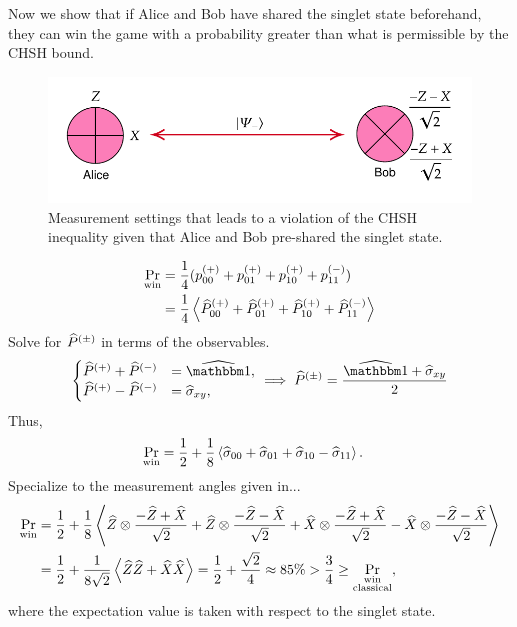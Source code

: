 Now we show that if Alice and Bob have shared the singlet state beforehand, they can win the game with a probability greater than what is permissible by the CHSH bound.
\begin{figure}[h]
	\centering
	\includegraphics[scale=0.75]{fig/chsh-measurement-setting}
	\caption{Measurement settings that leads to a violation of the CHSH inequality given that Alice and Bob pre-shared the singlet state.}
	\label{fig:chsh-setting}
\end{figure}
\begin{align}
	\Pr_{\textrm{win}} &= \frac{1}{4}(p_{00}^{(+)} + p_{01}^{(+)} + p_{10}^{(+)} + p_{11}^{(-)}) \\
	&= \frac{1}{4}\left\langle \widehat{P}_{00}^{(+)} + \widehat{P}_{01}^{(+)} + \widehat{P}_{10}^{(+)} + \widehat{P}_{11}^{(-)} \right\rangle
\end{align}
Solve for $\widehat{P}^{(\pm)}$ in terms of the observables.
\begin{align}
	\begin{cases}
		\op P^{(+)} + \op P^{(-)} &= \op \id, \\
		 \op P^{(+)} - \op P^{(-)} &= \op \sigma_{xy},
	\end{cases}
	\implies \op P^{(\pm)} = \frac{\op\id + \op\sigma_{xy}}{2}
\end{align}
Thus,
\begin{align}
	\Pr_{\textrm{win}} &= 
	\frac{1}{2} + \frac{1}{8}\left\langle \widehat{\sigma}_{00} + \widehat{\sigma}_{01} + \widehat{\sigma}_{10}  - \widehat{\sigma}_{11} \right\rangle. 
\end{align}
Specialize to the measurement angles given in...
\begin{align}
\Pr_{\textrm{win}} &=   \frac{1}{2} + 
	\frac{1}{8}\left\langle \widehat{Z}\otimes \frac{-\widehat{Z} + \widehat{X}}{\sqrt 2} 
	+ \widehat{Z}\otimes \frac{-\widehat{Z} - \widehat{X}}{\sqrt 2}
	+ \widehat{X}\otimes \frac{-\widehat{Z} + \widehat{X}}{\sqrt 2}
	- \widehat{X}\otimes \frac{-\widehat{Z} - \widehat{X}}{\sqrt 2} \right\rangle \\
	&=  \frac{1}{2} + 
	\frac{1}{8\sqrt 2} \left\langle \widehat{Z}\widehat{Z} + \widehat{X} \widehat{X} \right\rangle = \frac{1}{2} + \frac{\sqrt 2}{4} \approx 85\% >
	\frac{3}{4} \ge \Pr_{\substack{\textrm{win}\\ \textrm{classical}}},
\end{align}
where the expectation value is taken with respect to the singlet state.

